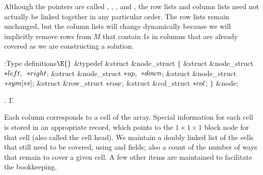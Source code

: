 Although the pointers are called , , ,
and , the row
lists and column lists need not actually be linked together in any particular
order. The row lists remain unchanged, but the column lists will change
dynamically because we will implicitly remove rows from $M$ that contain 1s in
columns that are already covered as we are constructing a solution.

\Y\B\4:Type definitions\X${}\E{}$\6
\&{typedef} \&{struct} \&{node\_struct} ${}\{{}$\1\6
\&{struct} \&{node\_struct} ${}{*}\\{left},{}$ ${}{*}\\{right}{}$;\6
\&{struct} \&{node\_struct} ${}{*}\\{up},{}$ ${}{*}\\{down}{}$;\6
\&{struct} \&{node\_struct} ${}{*}\\{sym}[\\{ss}]{}$;\6
\&{struct} \&{row\_struct} ${}{*}\\{row}{}$;\6
\&{struct} \&{col\_struct} ${}{*}\\{col}{}$;\2\6
${}\}{}$ \&{node};\par
{}.
\U1.\fi

Each column corresponds to a cell of the array. Special information for
each cell is stored in an appropriate record, which points to the
$1\times1\times1$ block node for that cell (also called the cell head).
We maintain a doubly linked list of the
cells that still need to be covered, using  and 
fields;
also a count of the number of ways that remain to cover a given cell.
A few other items are maintained to facilitate the bookkeeping.


